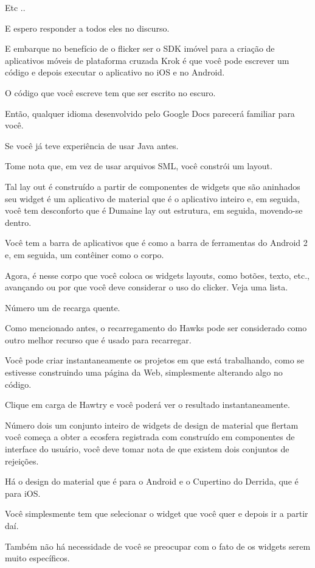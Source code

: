 Etc ..

E espero responder a todos eles no discurso.

E embarque no benefício de o flicker ser o SDK imóvel para a criação de aplicativos móveis de plataforma cruzada Krok é que você pode escrever um código e depois executar o aplicativo no iOS e no Android.

O código que você escreve tem que ser escrito no escuro.

Então, qualquer idioma desenvolvido pelo Google Docs parecerá familiar para você.

Se você já teve experiência de usar Java antes.

Tome nota que, em vez de usar arquivos SML, você constrói um layout.

Tal lay out é construído a partir de componentes de widgets que são aninhados seu widget é um aplicativo de material que é o aplicativo inteiro e, em seguida, você tem desconforto que é Dumaine lay out estrutura, em seguida, movendo-se dentro.

Você tem a barra de aplicativos que é como a barra de ferramentas do Android 2 e, em seguida, um contêiner como o corpo.

Agora, é nesse corpo que você coloca os widgets layouts, como botões, texto, etc., avançando ou por que você deve considerar o uso do clicker. Veja uma lista.

Número um de recarga quente.

Como mencionado antes, o recarregamento do Hawks pode ser considerado como outro melhor recurso que é usado para recarregar.

Você pode criar instantaneamente os projetos em que está trabalhando, como se estivesse construindo uma página da Web, simplesmente alterando algo no código.

Clique em carga de Hawtry e você poderá ver o resultado instantaneamente.

Número dois um conjunto inteiro de widgets de design de material que flertam você começa a obter a ecosfera registrada com construído em componentes de interface do usuário, você deve tomar nota de que existem dois conjuntos de rejeições.

Há o design do material que é para o Android e o Cupertino do Derrida, que é para iOS.

Você simplesmente tem que selecionar o widget que você quer e depois ir a partir daí.

Também não há necessidade de você se preocupar com o fato de os widgets serem muito específicos.

